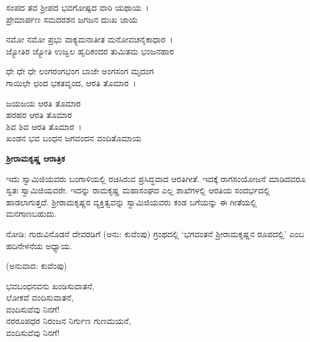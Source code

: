 
\begin{myquote}
ಸಂಪದ ತವ ಶ‍್ರೀಪದ ಭವಗೋಷ್ಪದ ವಾರಿ ಯಥಾಯ~।\\ಪ್ರೇಮಾರ್ಪಣ ಸಮದರಶನ ಜಗಜನ ದುಃಖ ಜಾಯ
\end{myquote}


\begin{myquote}
ನಮೋ ನಮೋ ಪ್ರಭು ವಾಕ್ಯಮನಾತೀತ ಮನೋವಚನೈಕಾಧಾರ~।\\ಜ್ಯೋತಿರ ಜ್ಯೋತಿ ಉಜ್ವಲ ಹೃದಿಕಂದರ ತುಮಿತಮ ಭಂಜನಹಾರ
\end{myquote}


\begin{myquote}
ಧೇ ಧೇ ಧೇ ಲಂಗರಂಗಭಂಗ ಬಾಜೇ ಅಂಗಸಂಗ ಮೃದಂಗ\\ಗಾಯಿಛೇ ಛಂದ ಭಕತವೃಂದ, ಆರತಿ ತೊಮಾರ~।
\end{myquote}

\begin{myquote}
ಜಯಜಯ ಆರತಿ ತೊಮಾರ\\ಹರಹರ ಆರತಿ ತೊಮಾರ\\ಶಿವ ಶಿವ ಆರತಿ ತೊಮಾರ~।\\ಖಂಡನ ಭವ ಬಂಧನ ಜಗವಂದನ ವಂದಿತೊಮಾಯ
\end{myquote}


\begin{center}
\textbf{ಶ‍್ರೀರಾಮಕೃಷ್ಣ ಆರಾತ್ರಿಕ}
\end{center}

ಇದು ಸ್ವಾಮಿಜಿಯವರು ಬಂಗಾಳಿಯಲ್ಲಿ ರಚಿಸಿರುವ ಪ್ರಸಿದ್ಧವಾದ ಆರತಿಗೀತೆ. ಇದಕ್ಕೆ ರಾಗಸಂಯೋಜನೆ ಮಾಡಿದವರೂ ಸ್ವತಃ ಸ್ವಾಮಿಜಿಯವರೇ. ಇದನ್ನು ರಾಮಕೃಷ್ಣ ಮಹಾಸಂಘದ ಎಲ್ಲ ಶಾಖೆಗಳಲ್ಲಿ ಆರತಿಯ ಸಂದರ್ಭದಲ್ಲಿ ಹಾಡಲಾಗುತ್ತದೆ. ಶ‍್ರೀರಾಮಕೃಷ್ಣರ ವ್ಯಕ್ತಿತ್ವವನ್ನು ಸ್ವಾಮಿಜಿಯವರು ಕಂಡ ಬಗೆಯನ್ನು ಈ ಗೀತೆಯಲ್ಲಿ ಮನಗಾಣಬಹುದು.

ನೋಡಿ: ಗುರುವಿನೊಡನೆ ದೇವರಡಿಗೆ (ಅನು: ಕುವೆಂಪು) ಗ್ರಂಥದಲ್ಲಿ ‘ಭಗವಂತನೆ ಶ‍್ರೀರಾಮಕೃಷ್ಣನ ರೂಪದಲ್ಲಿ’ ಎಂಬ ಹದಿನೇಳನೆಯ ಅಧ್ಯಾಯ.

\begin{center}
(ಅನುವಾದ: ಕುವೆಂಪು)
\end{center}

\begin{myquote}
ಭವಬಂಧನವನು ಖಂಡಿಸುವಾತನೆ,\\ಲೋಕವೆ ವಂದಿಸುವಾತನೆ,\\ವಂದಿಸುವೆವು ನಿನಗೆ!\\ನರರೂಪಧರ ನಿರಂಜನ ನಿರ್ಗುಣ ಗುಣಮಯನೆ,\\ವಂದಿಸುವೆವು ನಿನಗೆ!
\end{myquote}

